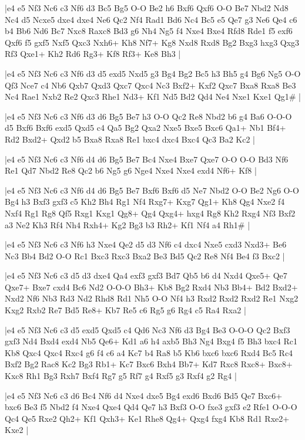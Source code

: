 \whitename{}
\blackname{}
\makegametitle
|e4 e5 Nf3 Nc6 c3 Nf6 d3 Bc5 Bg5 O-O Be2 h6 Bxf6 Qxf6 O-O Be7 Nbd2 Nd8 Nc4 d5 Ncxe5 dxe4 dxe4 Ne6 Qc2 Nf4 Rad1 Bd6 Nc4 Bc5 e5 Qe7 g3 Ne6 Qe4 c6 b4 Bb6 Nd6 Bc7 Nxc8 Raxc8 Bd3 g6 Nh4 Ng5 f4 Nxe4 Bxe4 Rfd8 Rde1 f5 exf6 Qxf6 f5 gxf5 Nxf5 Qxc3 Nxh6+ Kh8 Nf7+ Kg8 Nxd8 Rxd8 Bg2 Bxg3 hxg3 Qxg3 Rf3 Qxe1+ Kh2 Rd6 Rg3+ Kf8 Rf3+ Ke8 Bh3  |

\whitename{}
\blackname{}
\makegametitle
|e4 e5 Nf3 Nc6 c3 Nf6 d3 d5 exd5 Nxd5 g3 Bg4 Bg2 Bc5 h3 Bh5 g4 Bg6 Ng5 O-O Qf3 Nce7 c4 Nb6 Qxb7 Qxd3 Qxc7 Qxc4 Nc3 Bxf2+ Kxf2 Qxc7 Bxa8 Rxa8 Be3 Nc4 Rae1 Nxb2 Re2 Qxc3 Rhe1 Nd3+ Kf1 Nd5 Bd2 Qd4 Ne4 Nxe1 Kxe1 Qg1\#  |

\whitename{}
\blackname{}
\makegametitle
|e4 e5 Nf3 Nc6 c3 Nf6 d3 d6 Bg5 Be7 h3 O-O Qc2 Re8 Nbd2 b6 g4 Ba6 O-O-O d5 Bxf6 Bxf6 exd5 Qxd5 c4 Qa5 Bg2 Qxa2 Nxe5 Bxe5 Bxc6 Qa1+ Nb1 Bf4+ Rd2 Bxd2+ Qxd2 b5 Bxa8 Rxa8 Re1 bxc4 dxc4 Bxc4 Qc3 Ba2 Kc2  |

\whitename{}
\blackname{}
\makegametitle
|e4 e5 Nf3 Nc6 c3 Nf6 d4 d6 Bg5 Be7 Bc4 Nxe4 Bxe7 Qxe7 O-O O-O Bd3 Nf6 Re1 Qd7 Nbd2 Re8 Qc2 b6 Ng5 g6 Nge4 Nxe4 Nxe4 exd4 Nf6+ Kf8  |

\whitename{}
\blackname{}
\makegametitle
|e4 e5 Nf3 Nc6 c3 Nf6 d4 d6 Bg5 Be7 Bxf6 Bxf6 d5 Ne7 Nbd2 O-O Be2 Ng6 O-O Bg4 h3 Bxf3 gxf3 c5 Kh2 Bh4 Rg1 Nf4 Rxg7+ Kxg7 Qg1+ Kh8 Qg4 Nxe2 f4 Nxf4 Rg1 Rg8 Qf5 Rxg1 Kxg1 Qg8+ Qg4 Qxg4+ hxg4 Rg8 Kh2 Rxg4 Nf3 Bxf2 a3 Ne2 Kh3 Rf4 Nh4 Rxh4+ Kg2 Bg3 b3 Rh2+ Kf1 Nf4 a4 Rh1\#  |

\whitename{}
\blackname{}
\makegametitle
|e4 e5 Nf3 Nc6 c3 Nf6 h3 Nxe4 Qe2 d5 d3 Nf6 c4 dxc4 Nxe5 cxd3 Nxd3+ Be6 Nc3 Bb4 Bd2 O-O Rc1 Bxc3 Rxc3 Bxa2 Be3 Bd5 Qc2 Re8 Nf4 Be4 f3 Bxc2  |

\whitename{}
\blackname{}
\makegametitle
|e4 e5 Nf3 Nc6 c3 d5 d3 dxe4 Qa4 exf3 gxf3 Bd7 Qb5 b6 d4 Nxd4 Qxe5+ Qe7 Qxe7+ Bxe7 cxd4 Bc6 Nd2 O-O-O Bh3+ Kb8 Bg2 Rxd4 Nb3 Bb4+ Bd2 Bxd2+ Nxd2 Nf6 Nb3 Rd3 Nd2 Rhd8 Rd1 Nh5 O-O Nf4 h3 Rxd2 Rxd2 Rxd2 Re1 Nxg2 Kxg2 Rxb2 Re7 Bd5 Re8+ Kb7 Re5 c6 Rg5 g6 Rg4 c5 Ra4 Rxa2  |

\whitename{}
\blackname{}
\makegametitle
|e4 e5 Nf3 Nc6 c3 d5 exd5 Qxd5 c4 Qd6 Nc3 Nf6 d3 Bg4 Be3 O-O-O Qc2 Bxf3 gxf3 Nd4 Bxd4 exd4 Nb5 Qe6+ Kd1 a6 h4 axb5 Bh3 Ng4 Bxg4 f5 Bh3 bxc4 Rc1 Kb8 Qxc4 Qxc4 Rxc4 g6 f4 c6 a4 Kc7 b4 Ra8 b5 Kb6 bxc6 bxc6 Rxd4 Bc5 Rc4 Bxf2 Bg2 Rac8 Kc2 Bg3 Rb1+ Kc7 Bxc6 Bxh4 Bb7+ Kd7 Rxc8 Rxc8+ Bxc8+ Kxc8 Rh1 Bg3 Rxh7 Bxf4 Rg7 g5 Rf7 g4 Rxf5 g3 Rxf4 g2 Rg4  |

\whitename{}
\blackname{}
\makegametitle
|e4 e5 Nf3 Nc6 c3 d6 Bc4 Nf6 d4 Nxe4 dxe5 Bg4 exd6 Bxd6 Bd5 Qe7 Bxc6+ bxc6 Be3 f5 Nbd2 f4 Nxe4 Qxe4 Qd4 Qe7 h3 Bxf3 O-O fxe3 gxf3 e2 Rfe1 O-O-O Qc4 Qe5 Rxe2 Qh2+ Kf1 Qxh3+ Ke1 Rhe8 Qg4+ Qxg4 fxg4 Kb8 Rd1 Rxe2+ Kxe2  |

